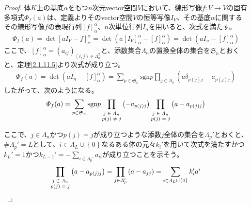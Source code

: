 \documentclass[dvipdfmx]{jsarticle}
\begin{document}
\begin{proof}
体$K$上の基底$\alpha$をもつ$n$次元vector空間$V$において、線形写像$f:V \rightarrow V$の固有多項式$\varPhi_{f}(a)$は、定義よりそのvector空間$V$の恒等写像$I_{V}$、その基底$\alpha$に関するその線形写像$f$の表現行列$[ f]_{\alpha}^{\alpha}$、$n$次単位行列$I_{n}$を用いると、次式を満たす。
\begin{align*}
\varPhi_{f}(a) = \det\left[ aI_{V} - f \right]_{\alpha}^{\alpha} = \det\left( a\left[ I_{V} \right]_{\alpha}^{\alpha} - [ f]_{\alpha}^{\alpha} \right) = \det\left( aI_{n} - [ f]_{\alpha}^{\alpha} \right)
\end{align*}
ここで、$[ f]_{\alpha}^{\alpha} = \left( a_{ij} \right)_{(i,j) \in \varLambda_{n}^{2}}$と、添数集合$\varLambda_{n}$の置換全体の集合を$\mathfrak{S}_{n}$とおくと、定理\ref{2.1.11.5}より次式が成り立つ。
\begin{align*}
\varPhi_{f}(a) = \det\left( aI_{n} - [ f]_{\alpha}^{\alpha} \right) = \sum_{p \in \mathfrak{S}_{n}} {{\mathrm{sgn} }p\prod_{j \in \varLambda_{n}} \left( a\delta_{p(j)j} - a_{p(j)j} \right)}
\end{align*}
したがって、次のようになる。
\begin{align*}
\varPhi_{f}(a) = \sum_{p \in \mathfrak{S}_{n}} {{\mathrm{sgn} }p\prod_{\scriptsize \begin{matrix} j \in \varLambda_{n} \\ p(j) \neq j \end{matrix}} \left( - a_{p(j)j} \right)\prod_{\scriptsize \begin{matrix} j \in \varLambda_{n} \\ p(j) = j \end{matrix}} \left( a - a_{p(j)j} \right)}
\end{align*}\par
ここで、$j \in \varLambda_{n}$かつ$p(j) = j$が成り立つような添数$j$全体の集合を$\varLambda_{p}'$とおくと、$\# \varLambda_{p}' = L$として、$i \in \varLambda_{L} \cup \left\{ 0 \right\}$なるある体の元々$k_{i}'$を用いて次式を満たすかつ$k_{L}' = 1$かつ$k_{L - 1}' = - \sum_{i \in \varLambda_{p}'} a_{ii}$が成り立つことを示そう。
\begin{align*}
\prod_{\scriptsize \begin{matrix} j \in \varLambda_{n}\\ p(j) = j \\ \end{matrix}} \left( a - a_{p(j)j} \right) = \prod_{j \in \varLambda_{p}'} \left( a - a_{jj} \right) = \sum_{i \in \varLambda_{L} \cup \left\{ 0 \right\}} {k_{i}'a^{i}}

\end{align*}
\end{proof}
\end{document}
